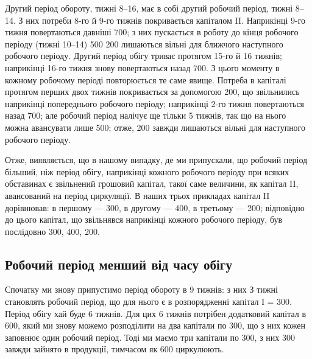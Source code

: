Другий період обороту, тижні 8--16, має в собі другий робочий
період, тижні 8--14. З них потреби 8-го й 9-го тижнів покривається
капіталом II. Наприкінці 9-го тижня повертаються давніші 700;
з них пускається в роботу до кінця робочого періоду (тижні 10--14)
500 200 лишаються вільні для ближчого наступного
робочого періоду. Другий період обігу триває протягом 15-го й 16 тижнів;
наприкінці 16-го тижня знову повертаються назад 700.
З цього моменту в кожному робочому періоді повторюється те саме
явище. Потреба в капіталі протягом перших двох тижнів покривається
за допомогою 200, що звільнились наприкінці попереднього
робочого періоду; наприкінці 2-го тижня повертаються назад 700; але робочий період налічує ще тільки 5 тижнів, так що на нього
можна авансувати лише 500; отже, 200 завжди лишаються
вільні для наступного робочого періоду.

Отже, виявляється, що в нашому випадку, де ми припускали, що робочий
період більший, ніж період обігу, наприкінці кожного робочого
періоду при всяких обставинах є звільнений грошовий капітал, такої
саме величини, як капітал II, авансований на період циркуляції. В наших
трьох прикладах капітал II дорівнював: в першому — 300, в
другому — 400, в третьому — 200; відповідно до
цього капітал, що звільнявся наприкінці кожного робочого періоду, був
послідовно 300, 400, 200.

\subsection{Робочий період менший від часу обігу}

Спочатку ми знову припустимо період обороту в 9 тижнів: з них
З тижні становлять робочий період, що для нього є в розпорядженні
капітал  І = 300. Період обігу хай буде 6 тижнів. Для цих
6 тижнів потрібен додатковий капітал в 600, який ми знову
можемо розподілити на два капітали по 300, що з них кожен
заповнює один робочий період. Тоді ми маємо три капітали по 300, з них 300 завжди зайнято в продукції, тимчасом як
600 циркулюють.

